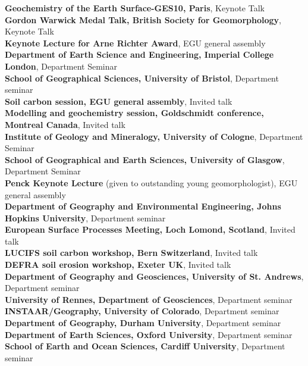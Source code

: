 \documentclass[10pt, a4paper]{article}
\newcommand{\years}[1]{\marginnote{\scriptsize #1}}
\begin{document}
\textbf{Geochemistry of the Earth Surface-GES10, Paris}, Keynote Talk\\[0.05cm]
\textbf{Gordon Warwick Medal Talk, British Society for Geomorphology}, Keynote Talk\\[0.05cm]
\years{2013}\textbf{Keynote Lecture for Arne Richter Award}, EGU general assembly\\[0.05cm]
\textbf{Department of Earth Science and Engineering, Imperial College London},  Department Seminar\\[0.05cm]
\textbf{School of Geographical Sciences, University of Bristol}, Department seminar\\[0.05cm]  
\years{2012}\textbf{Soil carbon session, EGU general assembly}, Invited talk\\[0.05cm]
\textbf{Modelling and geochemistry session, Goldschmidt conference, Montreal Canada}, Invited talk\\[0.05cm]
\textbf{Institute of Geology and Mineralogy, University of Cologne}, Department Seminar\\[0.05cm]
\textbf{School of Geographical and Earth Sciences, University of Glasgow}, Department Seminar\\[0.05cm]
\years{2011}\textbf{Penck Keynote Lecture} (given to outstanding young geomorphologist), EGU general assembly\\[0.05cm]
\textbf{Department of Geography and Environmental Engineering, Johns Hopkins University}, Department seminar\\[0.05cm]
\textbf{European Surface Processes Meeting, Loch Lomond, Scotland}, Invited talk\\[0.05cm]
\textbf{LUCIFS soil carbon workshop, Bern Switzerland}, Invited talk\\[0.05cm]
\textbf{DEFRA soil erosion workshop, Exeter UK}, Invited talk\\[0.05cm]
\years{2010}\textbf{Department of Geography and Geosciences, University of St. Andrews}, Department seminar\\[0.05cm]
\textbf{University of Rennes, Department of Geosciences}, Department seminar\\[0.05cm]
\years{2009}\textbf{INSTAAR/Geography, University of Colorado}, Department seminar\\[0.05cm]
\textbf{Department of Geography, Durham University}, Department seminar\\[0.05cm]
\textbf{Department of Earth Sciences, Oxford University}, Department seminar\\[0.05cm]
\textbf{School of Earth and Ocean Sciences, Cardiff University}, Department seminar\\[0.05cm]
\end{document}
